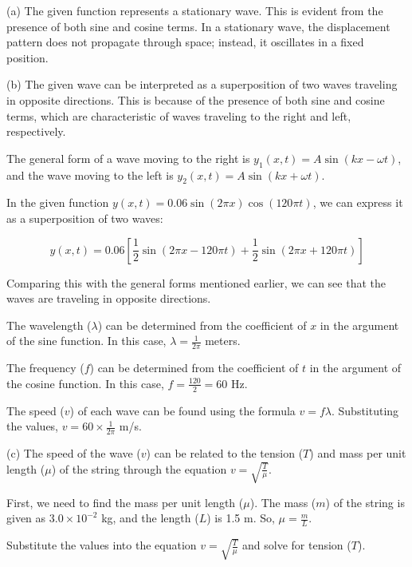 \documentclass{article}
\begin{document}
(a) The given function represents a stationary wave. This is evident from the presence of both sine and cosine terms. In a stationary wave, the displacement pattern does not propagate through space; instead, it oscillates in a fixed position.

(b) The given wave can be interpreted as a superposition of two waves traveling in opposite directions. This is because of the presence of both sine and cosine terms, which are characteristic of waves traveling to the right and left, respectively.

The general form of a wave moving to the right is \( y_1(x, t) = A \sin(kx - \omega t) \), and the wave moving to the left is \( y_2(x, t) = A \sin(kx + \omega t) \).

In the given function \( y(x, t) = 0.06 \sin(2\pi x) \cos(120\pi t) \), we can express it as a superposition of two waves:

\[
y(x, t) = 0.06 \left[ \frac{1}{2}\sin(2\pi x - 120\pi t) + \frac{1}{2}\sin(2\pi x + 120\pi t) \right]
\]

Comparing this with the general forms mentioned earlier, we can see that the waves are traveling in opposite directions.

The wavelength (\( \lambda \)) can be determined from the coefficient of \( x \) in the argument of the sine function. In this case, \( \lambda = \frac{1}{2\pi} \) meters.

The frequency (\( f \)) can be determined from the coefficient of \( t \) in the argument of the cosine function. In this case, \( f = \frac{120}{2} = 60 \) Hz.

The speed (\( v \)) of each wave can be found using the formula \( v = f \lambda \). Substituting the values, \( v = 60 \times \frac{1}{2\pi} \) m/s.

(c) The speed of the wave (\( v \)) can be related to the tension (\( T \)) and mass per unit length (\( \mu \)) of the string through the equation \( v = \sqrt{\frac{T}{\mu}} \).

First, we need to find the mass per unit length (\( \mu \)). The mass (\( m \)) of the string is given as \( 3.0 \times 10^{-2} \) kg, and the length (\( L \)) is 1.5 m. So, \( \mu = \frac{m}{L} \).

Substitute the values into the equation \( v = \sqrt{\frac{T}{\mu}} \) and solve for tension (\( T \)).
\end{document}
